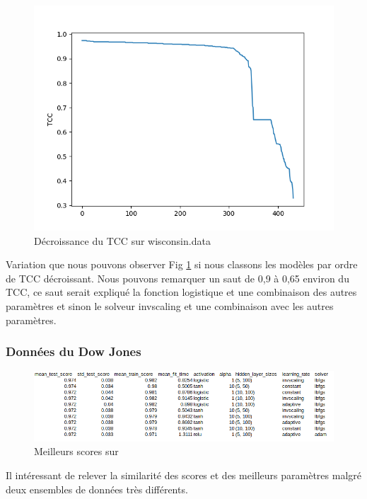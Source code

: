 \documentclass[10pt,letterpaper]{article}
\begin{document}
\begin{figure}[H]
\centering
\includegraphics[scale=0.65]{images/wisc_pmc_2.png}
\caption{Décroissance du TCC sur wisconsin.data}
\label{fig:TCCwisc}
\end{figure}
Variation que nous pouvons observer Fig \ref{fig:TCCwisc} si nous classons les modèles par ordre de TCC décroissant. Nous pouvons remarquer un saut de 0,9 à 0,65 environ du TCC, ce saut serait expliqué la fonction logistique et une combinaison des autres paramètres et sinon le solveur invscaling et une combinaison avec les autres paramètres.
\vspace{2mm}
\subsubsection*{Données du Dow Jones}

\begin{figure}[H]
\centering
\includegraphics[scale=0.65]{images/dj_pmc_1.png}
\caption{Meilleurs scores sur \protect{}}
\end{figure}

Il intéressant de relever la similarité des scores et des meilleurs paramètres malgré deux ensembles de données très différents.
\end{document}
